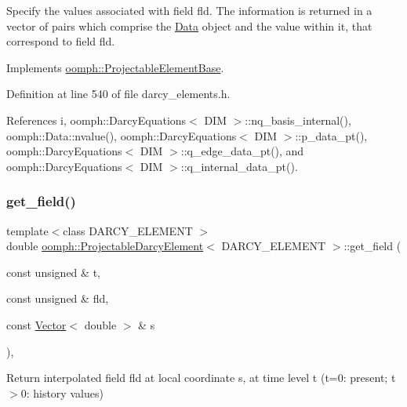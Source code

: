 Specify the values associated with field fld. The information is returned in a vector of pairs which comprise the \hyperlink{classoomph_1_1Data}{Data} object and the value within it, that correspond to field fld. 



Implements \hyperlink{classoomph_1_1ProjectableElementBase_a644306ebdf16f334344c2d27d72f18b7}{oomph\+::\+Projectable\+Element\+Base}.



Definition at line 540 of file darcy\+\_\+elements.\+h.



References i, oomph\+::\+Darcy\+Equations$<$ D\+I\+M $>$\+::nq\+\_\+basis\+\_\+internal(), oomph\+::\+Data\+::nvalue(), oomph\+::\+Darcy\+Equations$<$ D\+I\+M $>$\+::p\+\_\+data\+\_\+pt(), oomph\+::\+Darcy\+Equations$<$ D\+I\+M $>$\+::q\+\_\+edge\+\_\+data\+\_\+pt(), and oomph\+::\+Darcy\+Equations$<$ D\+I\+M $>$\+::q\+\_\+internal\+\_\+data\+\_\+pt().

\mbox{\label{classoomph_1_1ProjectableDarcyElement_a3911971a5babcc1bb85bd1dd46b30fc9}} 
\subsubsection{\texorpdfstring{get\+\_\+field()}{get\_field()}}
{\footnotesize\ttfamily template$<$class D\+A\+R\+C\+Y\+\_\+\+E\+L\+E\+M\+E\+NT $>$ \\
double \hyperlink{classoomph_1_1ProjectableDarcyElement}{oomph\+::\+Projectable\+Darcy\+Element}$<$ D\+A\+R\+C\+Y\+\_\+\+E\+L\+E\+M\+E\+NT $>$\+::get\+\_\+field (\begin{DoxyParamCaption}\item[{const unsigned \&}]{t,  }\item[{const unsigned \&}]{fld,  }\item[{const \hyperlink{classoomph_1_1Vector}{Vector}$<$ double $>$ \&}]{s }\end{DoxyParamCaption})\hspace{0.3cm}{\ttfamily [inline]}, {\ttfamily [virtual]}}



Return interpolated field fld at local coordinate s, at time level t (t=0\+: present; t$>$0\+: history values) 



